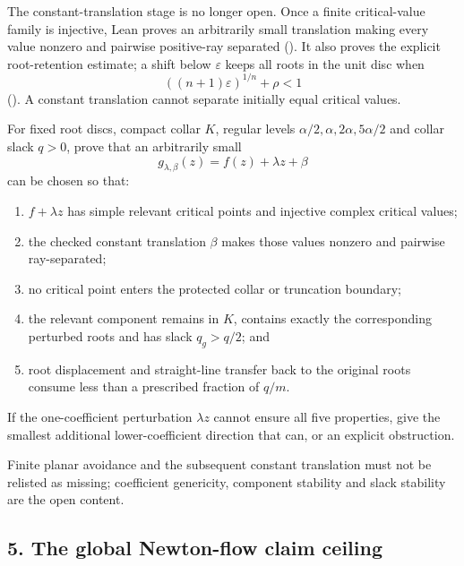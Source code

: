 The constant-translation stage is no longer open.  Once a finite critical-value
family is injective, Lean proves an arbitrarily small translation making every
value nonzero and pairwise positive-ray separated
().  It also proves the
explicit root-retention estimate; a shift below $\varepsilon$ keeps all roots
in the unit disc when
\[
 ((n+1)\varepsilon)^{1/n}+\rho<1
\]
().  A constant translation
cannot separate initially equal critical values.

\begin{problem}\label{prob:perturb1041}
For fixed root discs, compact collar $K$, regular levels
$\alpha/2,\alpha,2\alpha,5\alpha/2$ and collar slack $q>0$, prove that an
arbitrarily small
\[
 g_{\lambda,\beta}(z)=f(z)+\lambda z+\beta
\]
can be chosen so that:

\begin{enumerate}
\item $f+\lambda z$ has simple relevant critical points and injective complex
critical values;
\item the checked constant translation $\beta$ makes those values nonzero and
pairwise ray-separated;
\item no critical point enters the protected collar or truncation boundary;
\item the relevant component remains in $K$, contains exactly the corresponding
perturbed roots and has slack $q_g>q/2$; and
\item root displacement and straight-line transfer back to the original roots
consume less than a prescribed fraction of $q/m$.
\end{enumerate}

If the one-coefficient perturbation $\lambda z$ cannot ensure all five
properties, give the smallest additional lower-coefficient direction that can,
or an explicit obstruction.
\end{problem}

Finite planar avoidance and the subsequent constant translation must not be
relisted as missing; coefficient genericity, component stability and slack
stability are the open content.

\subsection*{5. The global Newton-flow claim ceiling}

